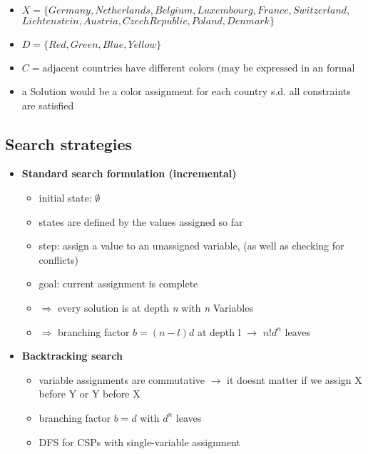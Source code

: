 \documentclass[12pt,a4paper]{article}
\begin{document}
\begin{itemize}
\item $X = \{Germany, Netherlands, Belgium, Luxembourg, France, Switzerland,$\\ $Lichtenstein, Austria, Czech Republic, Poland, Denmark\}$\\
\item $D = \{Red, Green, Blue, Yellow\}$\\
\item $C = \text{adjacent countries have different colors (may be expressed in an formal language)}$
\item a Solution would be a color assignment for each country s.d. all constraints are satisfied
\end{itemize}


\subsection{Search strategies}
\begin{itemize}
\item \textbf{Standard search formulation (incremental)}
\begin{itemize}
\item initial state: $\emptyset$
\item states are defined by the values assigned so far
\item step: assign a value to an unassigned variable, (as well as checking for conflicts)
\item goal: current assignment is complete
\item $\Rightarrow$ every solution is at depth \textit{n} with \textit{n} Variables
\item $\Rightarrow$ branching factor $b=(n-l)d$ at depth l $\rightarrow$ $n!d^n$ leaves 
\end{itemize}
\item \textbf{Backtracking search}
\begin{itemize}
\item variable assignments are commutative $\rightarrow$ it doesnt matter if we assign X before Y or Y before X
\item branching factor $b=d$ with $d^n$ leaves
\item DFS for CSPs with single-variable assignment
\end{itemize}
\end{itemize}
\end{document}
